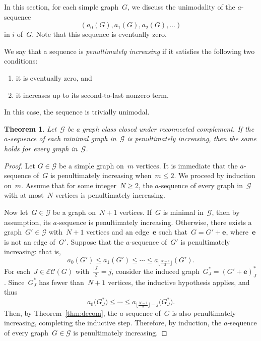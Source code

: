\documentclass[10pt]{amsart}
\theoremstyle{plain}
\newtheorem{theorem}{Theorem}[section]
\numberwithin{equation}{section}
\theoremstyle{definition}
\newcommand{\cG}{\mathcal{G}}
\newcommand{\edge}{\mathbf{e}}
\newcommand{\EC}{\mathcal{E}\mathcal{C}}
\begin{document}
In this section, for each simple graph~$G$, we discuss the unimodality of the $a$-sequence
$$
(a_0(G),a_1(G),a_2(G),\ldots)
$$
in $i$ of~$G$.
Note that this sequence is eventually zero.

We say that a sequence is \emph{penultimately increasing} if it satisfies the following two conditions:
\begin{enumerate}
  \item it is eventually zero, and
  \item it increases up to its second-to-last nonzero term.
\end{enumerate}
In this case, the sequence is trivially unimodal.

\begin{theorem}\label{thm:unimodal}
    Let~$\cG$ be a graph class closed under reconnected complement.
    If the $a$-sequence of each minimal graph in~$\cG$ is penultimately increasing, then the same holds for every graph in~$\cG$.
\end{theorem}

\begin{proof}
    Let $G \in \cG$ be a simple graph on~$m$ vertices.
    It is immediate that the $a$-sequence of~$G$ is penultimately increasing when~$m \leq 2$.
    We proceed by induction on~$m$.
    Assume that for some integer~$N \geq 2$, the $a$-sequence of every graph in~$\cG$ with at most~$N$ vertices is penultimately increasing.
    
    Now let~$G \in \cG$ be a graph on~$N+1$ vertices.
    If~$G$ is minimal in~$\cG$, then by assumption, its $a$-sequence is penultimately increasing.
    Otherwise, there exists a graph~$G' \in \cG$ with~$N+1$ vertices and an edge~$\edge$ such that~$G = G' + \edge$, where~$\edge$ is not an edge of~$G'$.
    Suppose that the $a$-sequence of~$G'$ is penultimately increasing: that is,
    $$
    a_0(G') \leq a_1(G') \leq \cdots \leq a_{\lfloor \frac{N-1}{2}\rfloor}(G').
    $$
    For each~$J \in \EC(G)$ with~$\frac{|J|}{2} = j$, consider the induced graph~$G^\ast_J = (G' + \edge)^\ast_J$.
    Since~$G^*_J$ has fewer than~$N+1$ vertices, the inductive hypothesis applies, and thus
    $$
    a_0\big( G^\ast_{J} \big) \leq \cdots \leq a_{\lfloor \frac{N-1}{2}\rfloor-j}\big( G^\ast_{J} \big).
    $$
    Then, by Theorem~\ref{thm:decom}, the $a$-sequence of~$G$ is also penultimately increasing, completing the inductive step.
    Therefore, by induction, the $a$-sequence of every graph~$G \in \cG$ is penultimately increasing.
\end{proof}
\end{document}
